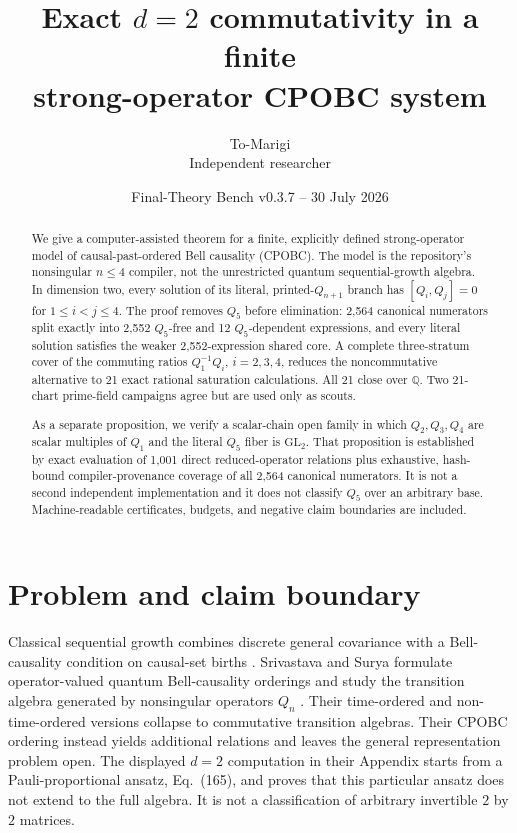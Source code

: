 \documentclass[11pt]{article}
\title{\textbf{Exact \(d=2\) commutativity in a finite\\
strong-operator CPOBC system}}
\author{To-Marigi\\
\small Independent researcher}
\date{Final-Theory Bench v0.3.7 -- 30 July 2026}
\theoremstyle{remark}
\theoremstyle{plain}
\newcommand{\QQ}{\mathbb{Q}}
\newcommand{\GL}{\mathrm{GL}}
\begin{document}
\maketitle

\begin{abstract}
We give a computer-assisted theorem for a finite, explicitly defined
strong-operator model of causal-past-ordered Bell causality (CPOBC).
The model is the repository's nonsingular \(n\leq 4\) compiler, not the
unrestricted quantum sequential-growth algebra.  In dimension two, every
solution of its literal, printed-\(Q_{n+1}\) branch has
\([Q_i,Q_j]=0\) for \(1\leq i<j\leq 4\).  The proof removes \(Q_5\)
before elimination: 2,564 canonical numerators split exactly into 2,552
\(Q_5\)-free and 12 \(Q_5\)-dependent expressions, and every literal
solution satisfies the weaker 2,552-expression shared core.  A complete
three-stratum cover of the commuting ratios \(Q_1^{-1}Q_i\), \(i=2,3,4\),
reduces the noncommutative alternative to 21 exact rational saturation
calculations.  All 21 close over \(\QQ\).  Two 21-chart prime-field
campaigns agree but are used only as scouts.

As a separate proposition, we verify a scalar-chain open family in which
\(Q_2,Q_3,Q_4\) are scalar multiples of \(Q_1\) and the literal \(Q_5\)
fiber is \(\GL_2\).  That proposition is established by exact evaluation
of 1,001 direct reduced-operator relations plus exhaustive, hash-bound
compiler-provenance coverage of all 2,564 canonical numerators.  It is not
a second independent implementation and it does not classify \(Q_5\) over
an arbitrary base.  Machine-readable certificates, budgets, and negative
claim boundaries are included.
\end{abstract}

\section{Problem and claim boundary}

Classical sequential growth combines discrete general covariance with a
Bell-causality condition on causal-set births
\cite{RideoutSorkin2000}.  Srivastava and Surya formulate operator-valued
quantum Bell-causality orderings and study the transition algebra generated
by nonsingular operators \(Q_n\) \cite{SrivastavaSurya2026}.  Their
time-ordered and non-time-ordered versions collapse to commutative
transition algebras.  Their CPOBC ordering instead yields additional
relations and leaves the general representation problem open.  The
displayed \(d=2\) computation in their Appendix starts from a
Pauli-proportional ansatz, Eq.\ (165), and proves that this particular
ansatz does not extend to the full algebra.  It is not a classification of
arbitrary invertible \(2\) by \(2\) matrices.
\end{document}
